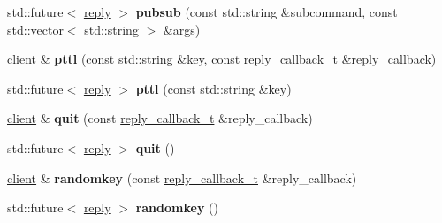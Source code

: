 \begin{DoxyCompactItemize}
\item 
\mbox{\label{classcpp__redis_1_1client_a9f5ae4ef589038af3f7e8304a56446e2}} 
std\+::future$<$ \hyperlink{classcpp__redis_1_1reply}{reply} $>$ {\bfseries pubsub} (const std\+::string \&subcommand, const std\+::vector$<$ std\+::string $>$ \&args)
\item 
\mbox{\label{classcpp__redis_1_1client_a2f10778d114d8144416b09645a7c6416}} 
\hyperlink{classcpp__redis_1_1client}{client} \& {\bfseries pttl} (const std\+::string \&key, const \hyperlink{classcpp__redis_1_1client_a061a1140d36d2eaeda82b09a0bb3f9f2}{reply\+\_\+callback\+\_\+t} \&reply\+\_\+callback)
\item 
\mbox{\label{classcpp__redis_1_1client_adf173046c5866f6a9b9cd297a79b3028}} 
std\+::future$<$ \hyperlink{classcpp__redis_1_1reply}{reply} $>$ {\bfseries pttl} (const std\+::string \&key)
\item 
\mbox{\label{classcpp__redis_1_1client_a455952961bd95a22630d1bd6c6a3f7a7}} 
\hyperlink{classcpp__redis_1_1client}{client} \& {\bfseries quit} (const \hyperlink{classcpp__redis_1_1client_a061a1140d36d2eaeda82b09a0bb3f9f2}{reply\+\_\+callback\+\_\+t} \&reply\+\_\+callback)
\item 
\mbox{\label{classcpp__redis_1_1client_a0b13beda169ce74720abf4bba2d69d68}} 
std\+::future$<$ \hyperlink{classcpp__redis_1_1reply}{reply} $>$ {\bfseries quit} ()
\item 
\mbox{\label{classcpp__redis_1_1client_a7ec81f685738479307e464db273201e6}} 
\hyperlink{classcpp__redis_1_1client}{client} \& {\bfseries randomkey} (const \hyperlink{classcpp__redis_1_1client_a061a1140d36d2eaeda82b09a0bb3f9f2}{reply\+\_\+callback\+\_\+t} \&reply\+\_\+callback)
\item 
\mbox{\label{classcpp__redis_1_1client_a021538472ad199d7a203a77af6aba96c}} 
std\+::future$<$ \hyperlink{classcpp__redis_1_1reply}{reply} $>$ {\bfseries randomkey} ()
\item 
\mbox{\label{classcpp__redis_1_1client_a14353780458071311d074fd951201f93}} 

\end{DoxyCompactItemize}
